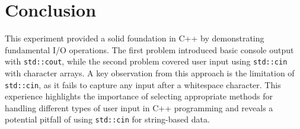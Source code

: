 \section{Conclusion}

This experiment provided a solid foundation in C++ by demonstrating fundamental I/O operations. The first problem introduced basic console output with \texttt{std::cout}, while the second problem covered user input using \texttt{std::cin} with character arrays. A key observation from this approach is the limitation of \texttt{std::cin}, as it fails to capture any input after a whitespace character. This experience highlights the importance of selecting appropriate methods for handling different types of user input in C++ programming and reveals a potential pitfall of using \texttt{std::cin} for string-based data.
